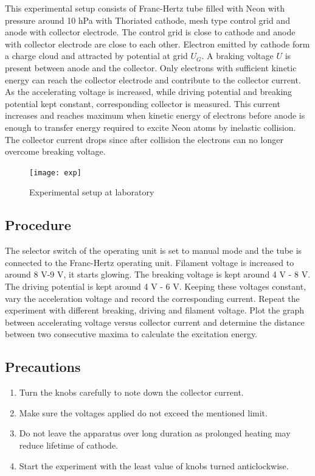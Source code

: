 \documentclass[a4paper, amsfonts, amssymb, amsmath, reprint, showkeys, nofootinbib, twoside]{revtex4-1}
\begin{document}
This experimental setup consists of Franc-Hertz tube filled with Neon with pressure around 10 hPa with Thoriated cathode, mesh type control grid and anode with collector electrode. The control grid is close to cathode and anode with collector electrode are close to each other. Electron emitted by cathode form a charge cloud and attracted by potential at grid $U_G$. A braking voltage $U$ is present between anode and the collector. Only electrons with sufficient kinetic energy can reach the collector electrode and contribute to the collector current. As the accelerating voltage is increased, while driving potential and breaking potential kept constant, corresponding collector is measured. This current increases and reaches maximum when kinetic energy of electrons before anode is enough to transfer energy required to excite Neon atoms by inelastic collision. The collector current drops since after collision the electrons can no longer overcome breaking voltage.

\begin{figure}[H] %
   \centering
   \texttt{[image: exp]} 
   \caption{Experimental setup at laboratory}
   \label{ed}
\end{figure}

\subsection{Procedure}
The selector switch of the operating unit is set to manual mode and the tube is connected to the Franc-Hertz operating unit. Filament voltage is increased to around 8 V-9 V, it starts glowing. The breaking voltage is kept around 4 V - 8 V. The driving potential is kept around 4 V - 6 V. Keeping these voltages constant, vary the acceleration voltage and record the corresponding current. Repeat the experiment with different breaking, driving and filament voltage. Plot the graph between accelerating voltage versus collector current and determine the distance between two consecutive maxima to calculate the excitation energy. 

\subsection{Precautions}
\begin{enumerate}
\item{Turn the knobs carefully to note down the collector current.}
\item{Make sure the voltages applied do not exceed the mentioned limit.}
\item{Do not leave the apparatus over long duration as prolonged heating may reduce lifetime of cathode.}
\item{Start the experiment with the least value of knobs turned anticlockwise.}
\end{enumerate}
\end{document}
